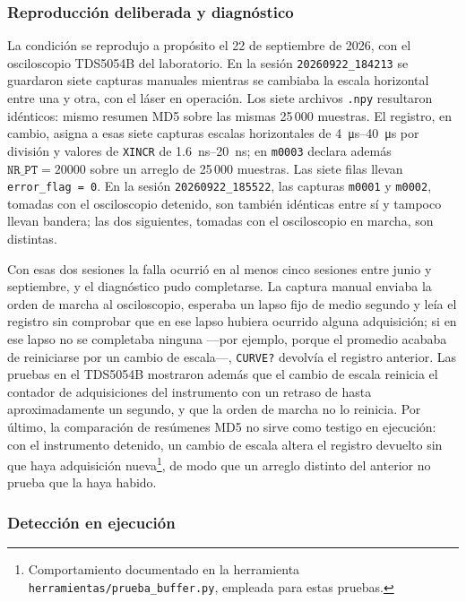 \subsubsection*{Reproducción deliberada y diagnóstico}

La condición se reprodujo a propósito el 22 de septiembre de 2026, con
el osciloscopio TDS5054B del laboratorio. En la sesión
\texttt{20260922\_184213} se guardaron siete capturas manuales mientras
se cambiaba la escala horizontal entre una y otra, con el láser en
operación. Los siete archivos \texttt{.npy} resultaron idénticos: mismo
resumen MD5 sobre las mismas 25\,000 muestras. El registro, en cambio,
asigna a esas siete capturas escalas horizontales de
\SIrange{4}{40}{\micro\second} por división y valores de
\texttt{XINCR} de \SIrange{1.6}{20}{\nano\second}; en \texttt{m0003}
declara además $\texttt{NR\_PT} = \num{20000}$ sobre un arreglo de
25\,000 muestras. Las siete filas llevan \texttt{error\_flag = 0}. En la
sesión \texttt{20260922\_185522}, las capturas \texttt{m0001} y
\texttt{m0002}, tomadas con el osciloscopio detenido, son también
idénticas entre sí y tampoco llevan bandera; las dos siguientes,
tomadas con el osciloscopio en marcha, son distintas.

Con esas dos sesiones la falla ocurrió en al menos cinco sesiones entre
junio y septiembre, y el diagnóstico pudo completarse. La captura
manual enviaba la orden de marcha al osciloscopio, esperaba un lapso
fijo de medio segundo y leía el registro sin comprobar que en ese lapso
hubiera ocurrido alguna adquisición; si en ese lapso no se completaba
ninguna ---por ejemplo, porque el promedio acababa de reiniciarse por
un cambio de escala---, \texttt{CURVE?} devolvía el registro anterior. Las pruebas en el
TDS5054B mostraron además que el cambio de escala reinicia el contador
de adquisiciones del instrumento con un retraso de hasta aproximadamente un segundo, y
que la orden de marcha no lo reinicia. Por último, la comparación de
resúmenes MD5 no sirve como testigo en ejecución: con el instrumento
detenido, un cambio de escala altera el registro devuelto sin que haya
adquisición nueva\footnote{Comportamiento documentado en la herramienta
\texttt{herramientas/prueba\_buffer.py}, empleada para estas pruebas.},
de modo que un arreglo distinto del anterior no prueba que la haya
habido.

\subsubsection*{Detección en ejecución}

